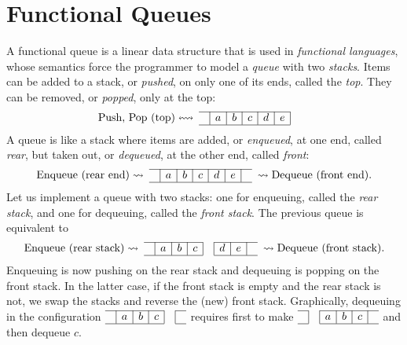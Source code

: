 \section{Functional Queues}

A functional queue is a linear data structure that is used in
\emph{functional languages}, whose semantics force the programmer to
model a \emph{queue} with two \emph{stacks}. Items can be added to a
stack, or \emph{pushed}, on only one of its ends, called the
\emph{top}. They can be removed, or \emph{popped}, only at the top:
\[
\begin{array}{@{}l@{}r@{\;}cc|c|c|c|c|c|cc@{\;}l@{}}
\cline{4-9}
& \text{Push, Pop (top)} & \leftrightsquigarrow & & a & b & c & d & e &&&\\
\cline{4-9}
\end{array}
\]
A queue is like a stack where items are added, or \emph{enqueued}, at
one end, called \emph{rear}, but taken out, or \emph{dequeued}, at the
other end, called \emph{front}:
\[
\begin{array}{@{}l@{}r@{\;}cc|c|c|c|c|c|cc@{\;}l@{}}
\cline{4-10}
& \text{Enqueue (rear end)} 
                & \rightsquigarrow & & a & b & c & d & e &
& \rightsquigarrow & \text{Dequeue (front end).}\\
\cline{4-10}
\end{array}
\]
Let us implement a queue with two stacks: one for enqueuing, called
the \emph{rear stack}, and one for dequeuing, called the \emph{front
  stack}. The previous queue is equivalent to
\[
\begin{array}{r@{\;}cc|c|c|c|c|c|c|cc@{\;}l}
  \cline{3-6}\cline{8-10}
  \text{Enqueue (rear stack)} & \rightsquigarrow & & a & b & c & & d & e & &
  \rightsquigarrow & \text{Dequeue (front stack).}\\
  \cline{3-6}\cline{8-10}
\end{array}
\]
Enqueuing is now pushing on the rear stack and dequeuing is popping on
the front stack. In the latter case, if the front stack is empty and
the rear stack is not, we swap the stacks and reverse the (new) front
stack. Graphically, dequeuing in the configuration 
\(\begin{array}{c|c|c|c|c|c}
  \cline{1-4}\cline{6-6}
  & a & b & c & &\\
  \cline{1-4}\cline{6-6}
\end{array}\)
requires first to make
\(\begin{array}{c|c|c|c|c|c}
  \cline{1-1}\cline{3-6}
  & & a & b & c &\\
  \cline{1-1}\cline{3-6}
\end{array}\)
and then dequeue \(c\).

